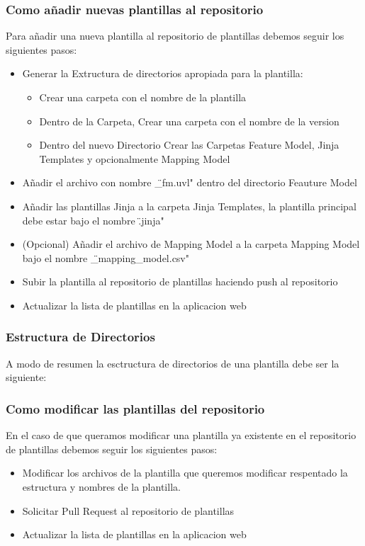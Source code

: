 \documentclass[12pt, a4paper, twoside]{article}
\begin{document}
\begin{umaappendices}
	\subsubsection{Como añadir nuevas plantillas al repositorio}
	Para añadir una nueva plantilla al repositorio de plantillas debemos seguir los siguientes pasos:
	\begin{itemize}
		\item Generar la Extructura de directorios apropiada para la plantilla:
		\begin{itemize}
			\item Crear una carpeta con el nombre de la plantilla
			\item Dentro de la Carpeta, Crear una carpeta con el nombre de la version
			\item Dentro del nuevo Directorio Crear las Carpetas Feature Model, Jinja Templates y opcionalmente Mapping Model
		\end{itemize}
		\item Añadir el archivo con nombre \"<Nombre de la Plantilla>\_fm.uvl" dentro del directorio Feauture Model
		\item Añadir las plantillas Jinja a la carpeta Jinja Templates, la plantilla principal debe estar bajo el nombre \"<Nombre de la Plantilla>.jinja"
		\item (Opcional) Añadir el archivo de Mapping Model  a la carpeta Mapping Model bajo el nombre \"<Nombre de la Plantilla>\_mapping\_model.csv"
		\item Subir la plantilla al repositorio de plantillas haciendo push al repositorio
		\item Actualizar la lista de plantillas en la aplicacion web
	\end{itemize}
	\subsubsection{Estructura de Directorios}
	 A modo de resumen la esctructura de directorios de una plantilla debe ser la siguiente:



	\subsubsection{Como modificar las plantillas del repositorio}
	En el caso de que queramos modificar una plantilla ya existente en el repositorio de plantillas debemos seguir los siguientes pasos:
	\begin{itemize}
		\item Modificar los archivos de la plantilla que queremos modificar respentado la estructura y nombres de la plantilla.
		\item Solicitar Pull Request al repositorio de plantillas
		\item Actualizar la lista de plantillas en la aplicacion web
	\end{itemize}


\end{umaappendices}
\end{document}
